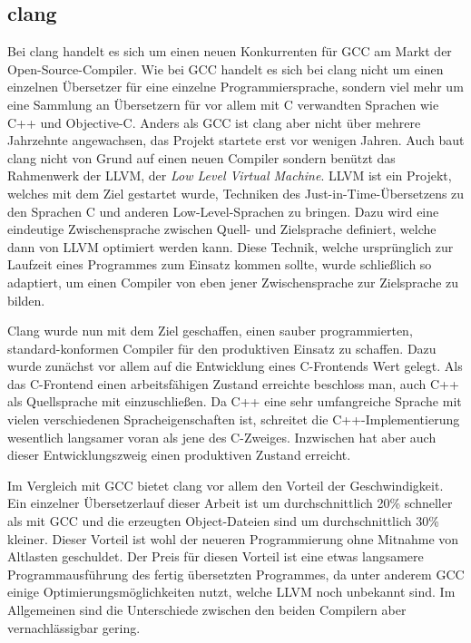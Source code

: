 \subsection{clang}
Bei clang handelt es sich um einen neuen Konkurrenten für GCC am Markt der Open-Source-Compiler. Wie bei GCC handelt es sich bei clang nicht um einen einzelnen Übersetzer für eine einzelne Programmiersprache,
sondern viel mehr um eine Sammlung an Übersetzern für vor allem mit C verwandten Sprachen wie C++ und Objective-C. Anders als GCC ist clang aber nicht über mehrere Jahrzehnte angewachsen, das Projekt
startete erst vor wenigen Jahren. Auch baut clang nicht von Grund auf einen neuen Compiler sondern benützt das Rahmenwerk der LLVM, der \textit{Low Level Virtual Machine}. LLVM ist ein Projekt, welches
mit dem Ziel gestartet wurde, Techniken des Just-in-Time-Übersetzens zu den Sprachen C und anderen Low-Level-Sprachen zu bringen. Dazu wird eine eindeutige Zwischensprache zwischen Quell- und Zielsprache
definiert, welche dann von LLVM optimiert werden kann. Diese Technik, welche ursprünglich zur Laufzeit eines Programmes zum Einsatz kommen sollte, wurde schließlich so adaptiert, um einen Compiler von
eben jener Zwischensprache zur Zielsprache zu bilden. 

Clang wurde nun mit dem Ziel geschaffen, einen sauber programmierten, standard-konformen Compiler für den produktiven Einsatz zu schaffen. Dazu wurde zunächst vor allem auf die Entwicklung eines C-Frontends
Wert gelegt. Als das C-Frontend einen arbeitsfähigen Zustand erreichte beschloss man, auch C++ als Quellsprache mit einzuschließen. Da C++ eine sehr umfangreiche Sprache mit vielen verschiedenen Spracheigenschaften 
ist, schreitet die C++-Implementierung wesentlich langsamer voran als jene des C-Zweiges. Inzwischen hat aber auch dieser Entwicklungszweig einen produktiven Zustand erreicht. 

Im Vergleich mit GCC bietet clang vor allem den Vorteil der Geschwindigkeit. Ein einzelner Übersetzerlauf dieser Arbeit ist um durchschnittlich 20\% schneller als mit GCC und die erzeugten Object-Dateien
sind um durchschnittlich 30\% kleiner. Dieser Vorteil ist wohl der neueren Programmierung ohne Mitnahme von Altlasten geschuldet. Der Preis für diesen Vorteil ist eine etwas langsamere Programmausführung
des fertig übersetzten Programmes, da unter anderem GCC einige Optimierungsmöglichkeiten nutzt, welche LLVM noch unbekannt sind. Im Allgemeinen sind die Unterschiede zwischen den beiden Compilern aber
vernachlässigbar gering.


